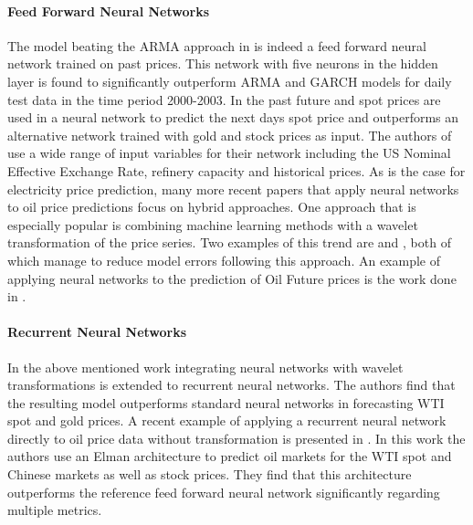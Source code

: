 \paragraph{Feed Forward Neural Networks}
The model beating the ARMA approach in \cite{moshiri_forecasting_2006} is indeed a feed forward neural network trained on past prices. This network with five neurons in the hidden layer is found to significantly outperform ARMA and GARCH models for daily test data in the time period 2000-2003. In \cite{haidar_forecasting_2008} the past future and spot prices are used in a neural network to predict the next days spot price and outperforms an alternative network trained with gold and stock prices as input. The authors of \cite{alizadeh_monthly_2010} use a wide range of input variables for their network including the US Nominal Effective Exchange Rate, refinery capacity and historical prices.  As is the case for electricity price prediction, many more recent papers that apply  neural networks to oil price predictions focus on hybrid approaches. One approach that is especially popular is combining machine learning methods with a wavelet transformation of the price series. Two examples of this trend are \citep{pang_forecasting_2011} and \cite{he_crude_2012}, both of which manage to reduce model errors following this approach.
An example of applying neural networks to the prediction of Oil Future prices is the work done in  \cite{shambora_are_2007}.

\paragraph{Recurrent Neural Networks}
In \cite{mingming_multiple_2012} the above mentioned work integrating neural networks with wavelet transformations is extended to recurrent neural networks. The authors find that the resulting model outperforms standard neural networks in forecasting WTI spot and gold prices. 
A recent example of applying a recurrent neural network directly to oil price data without transformation is presented in \cite{wang_forecasting_2016}. In this work the authors use an Elman architecture to predict oil markets for the WTI spot and Chinese markets as well as stock prices. They find that this architecture outperforms the reference feed forward neural network significantly regarding multiple metrics. 



